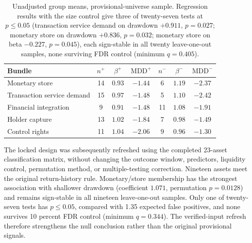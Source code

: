 \documentclass[10pt]{article}
\begin{document}
\begin{table}[ht]
\centering
\small
\begin{tabular}{lcccccc}
\toprule
Bundle & $n^{+}$ & $\beta^{+}$ & $\mathrm{MDD}^{+}$ & $n^{-}$ & $\beta^{-}$ & $\mathrm{MDD}^{-}$ \\
\midrule
Monetary store              & 14 & $0.93$ & $-1.44$ & 6  & $1.19$ & $-2.37$ \\
Transaction service demand  & 15 & $0.97$ & $-1.48$ & 5  & $1.10$ & $-2.42$ \\
Financial integration       & 9  & $0.91$ & $-1.48$ & 11 & $1.08$ & $-1.91$ \\
Holder capture              & 13 & $1.02$ & $-1.84$ & 7  & $0.98$ & $-1.49$ \\
Control rights              & 11 & $1.04$ & $-2.06$ & 9  & $0.96$ & $-1.30$ \\
\bottomrule
\end{tabular}
\caption{Unadjusted group means, provisional-universe sample. Regression results with the size control give three of twenty-seven tests at $p \le 0.05$ (transaction service demand on drawdown $+0.911$, $p=0.027$; monetary store on drawdown $+0.836$, $p=0.032$; monetary store on beta $-0.227$, $p=0.045$), each sign-stable in all twenty leave-one-out samples, none surviving FDR control (minimum $q = 0.405$).}
\end{table}

The locked design was subsequently refreshed using the completed 23-asset classification matrix, without changing the outcome window, predictors, liquidity control, permutation method, or multiple-testing correction. Nineteen assets meet the original return-history rule. Monetary/store membership has the strongest association with shallower drawdown (coefficient $1.071$, permutation $p=0.0128$) and remains sign-stable in all nineteen leave-one-out samples. Only one of twenty-seven tests has $p\le0.05$, compared with 1.35 expected false positives, and none survives 10 percent FDR control (minimum $q=0.344$). The verified-input refresh therefore strengthens the null conclusion rather than the original provisional signals.
\end{document}
